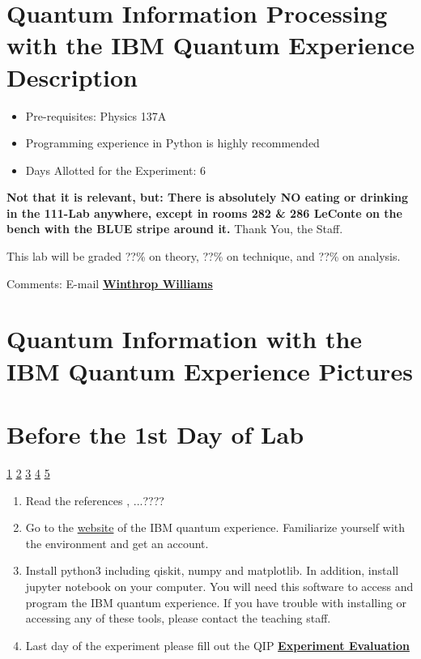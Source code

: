 \documentclass{../lab}
\begin{document}
\maketitle

\tableofcontents

\section{Quantum Information Processing with the IBM Quantum Experience Description}

\begin{itemize}
    \item Pre-requisites: Physics 137A
    \item Programming experience in Python is highly recommended

    \item Days Allotted for the Experiment: 6

\end{itemize}

\textbf{Not that it is relevant, but: There is absolutely NO eating or drinking in the 111-Lab anywhere, except in rooms 282 \& 286 LeConte on the bench with the BLUE stripe around it.} Thank You, the Staff.

This lab will be graded ??\% on theory, ??\% on technique, and ??\% on analysis.

Comments: E-mail \href{\MailWinWilliams}{\textbf{Winthrop Williams}}


\section{Quantum Information with the IBM Quantum Experience Pictures}

\section{Before the 1st Day of Lab}

\signatures \hyperlink{???}{1} \hyperlink{???}{2} \hyperlink{???}{3} \hyperlink{???}{4} \hyperlink{???}{5} 

\begin{enumerate}
    \item Read the references \cite{Knill2002}, ...???? 
    
    \item Go to the \href{https://quantum-computing.ibm.com/}{website} of the IBM quantum experience. Familiarize yourself with the environment and get an account.
    \item Install python3 including qiskit, numpy and matplotlib. In addition, install jupyter notebook on your computer. You will need this software to access and program the IBM quantum experience. If you have trouble with installing or accessing any of these tools, please contact the teaching staff.
    \item Last day of the experiment please fill out the QIP  \href{\ExperimentEvaluation}{\textbf{Experiment Evaluation}}

\end{enumerate}
\end{document}
